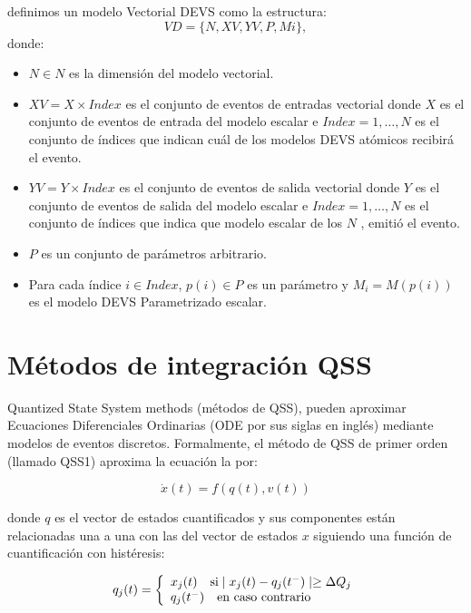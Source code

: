 \documentclass[a4paper,	11pt]{report}
\begin{document}
definimos un modelo Vectorial DEVS como la estructura:
\begin{equation}
V D = \{N, XV, Y V, P, {M i }\},
\end{equation}
donde:
\begin{itemize}
\item $N \in N$ es la dimensión del modelo vectorial.

\item $XV = X \times Index$ es el conjunto de eventos de entradas vectorial donde $X$ es el conjunto de eventos de entrada del modelo escalar e $Index = {1, \ldots , N }$ es el conjunto de índices que indican cuál de los modelos DEVS atómicos recibirá el evento.

\item $YV = Y \times Index$ es el conjunto de eventos de salida vectorial donde $Y$ es el conjunto de eventos de salida del modelo escalar e $Index = {1, \ldots , N }$ es el conjunto de índices que indica que modelo escalar de los $N$ , emitió el evento. %

\item $P$ es un conjunto de parámetros arbitrario.

\item Para cada índice $i \in Index$, $p(i) \in P$ es un parámetro y $M_i = M (p(i))$ es el modelo DEVS Parametrizado escalar.
\end{itemize}
	
\section{Métodos de integración QSS}
Quantized State System methods (métodos de QSS), pueden aproximar Ecuaciones Diferenciales Ordinarias (ODE por sus siglas en inglés) mediante modelos de eventos discretos. Formalmente, el método de QSS de primer orden (llamado QSS1) aproxima la ecuación la por:

\begin{equation}
\dot{x}(t) = f (q(t), v(t))
\end{equation}

donde $q$ es el vector de estados cuantificados y sus componentes están relacionadas una a una con las del vector de estados $x$ siguiendo una función de cuantificación con histéresis:

\begin{equation}
q_j(t) = \left\{ 
  \begin{array}{l l}
    x_j(t)  \quad \text{si} \mid x_j (t ) - q_j (t^{-} ) \mid \geq \Delta Q_j \\
    q_j (t^{-} ) \quad \text{en caso contrario}
  \end{array} \right.
\end{equation}
\end{document}
